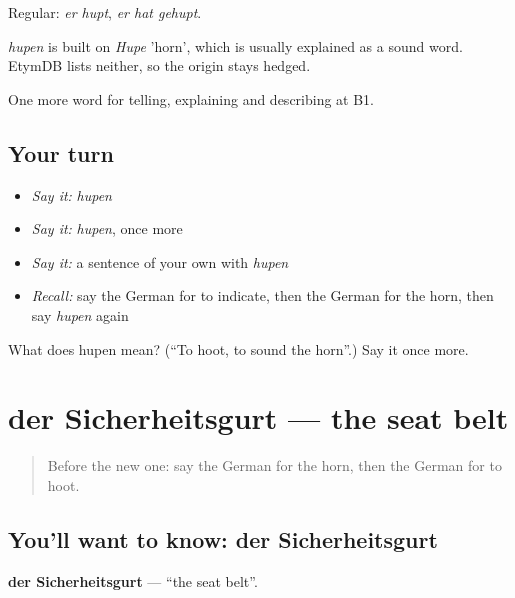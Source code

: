 Regular: \emph{er hupt}, \emph{er hat gehupt}.

\begin{cousinweb}
\emph{hupen} is built on \emph{Hupe} 'horn', which is usually explained as a sound word. EtymDB lists neither, so the origin stays hedged.
\end{cousinweb}

\begin{grammarlens}[title={What you've built}]
One more word for telling, explaining and describing at B1.
\end{grammarlens}

\subsection*{Your turn}
\begin{itemize}
\raggedright
  \item \emph{Say it:} \emph{hupen}
  \item \emph{Say it:} \emph{hupen}, once more
  \item \emph{Say it:} a sentence of your own with \emph{hupen}
  \item \emph{Recall:} say the German for to indicate, then the German for the horn, then say \emph{hupen} again
\end{itemize}

\begin{tcolorbox}[breakable,colback=teal!4,colframe=teal!35!black,title={Before you move on}]
What does hupen mean? (\textquotedblleft{}To hoot, to sound the horn\textquotedblright{}.) Say it once more.
\end{tcolorbox}
\section[der Sicherheitsgurt]{der Sicherheitsgurt — the seat belt}

\label{lesson:GE-C401-sicherheitsgurt}



\begin{quote}
Before the new one: say the German for the horn, then the German for to hoot.
\end{quote}

\subsection*{You'll want to know: der Sicherheitsgurt}
\textbf{der Sicherheitsgurt} — \textquotedblleft{}the seat belt\textquotedblright{}.

